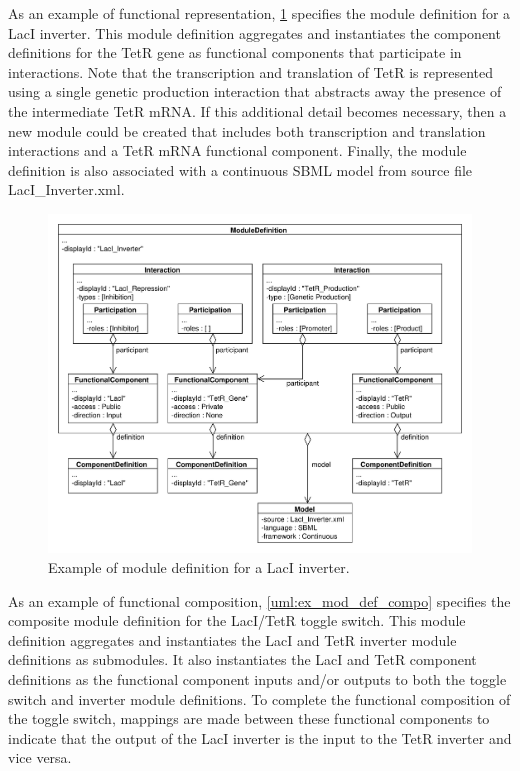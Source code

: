 
As an example of functional representation, \ref{uml:ex_mod_def} specifies the module definition for a LacI inverter. This module definition aggregates and instantiates the component definitions for the TetR gene as functional components that participate in interactions. Note that the transcription and translation of TetR is represented using a single genetic production interaction that abstracts away the presence of the intermediate TetR mRNA. If this additional detail becomes necessary, then a new module could be created that includes both transcription and translation interactions and a TetR mRNA functional component. Finally, the module definition is also associated with a continuous SBML model from source file LacI\_Inverter.xml.

\begin{figure}[ht]
\begin{center}
\includegraphics[width=\textwidth]{example_uml/toggle_3}
\caption[]{Example of module definition for a LacI inverter.}
\label{uml:ex_mod_def}
\end{center}
\end{figure}

As an example of functional composition, \ref{uml:ex_mod_def_compo} specifies the composite module definition for the LacI/TetR toggle switch. This module definition aggregates and instantiates the LacI and TetR inverter module definitions as submodules. It also instantiates the LacI and TetR component definitions as the functional component inputs and/or outputs to both the toggle switch and inverter module definitions. To complete the functional composition of the toggle switch, mappings are made between these functional components to indicate that the output of the LacI inverter is the input to the TetR inverter and vice versa.

